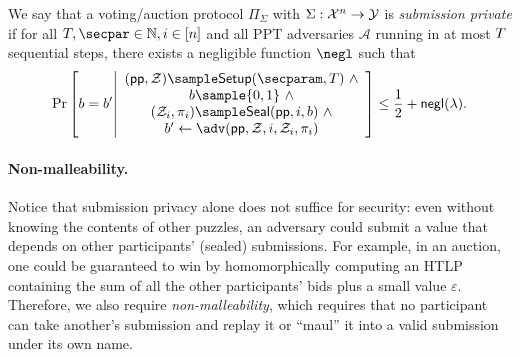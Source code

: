 \begin{definition}\label{def:submission_privacy}
We say that a voting/auction protocol $\Pi_\Sigma$ with $\Sigma: \mathcal{X}^n \to \mathcal{Y}$ is \emph{submission private} if for all $\Ttime,\secpar \in \mathbb{N}, i \in [n]$ and all PPT adversaries $\mathcal{A}$ running in at most $T$ sequential steps, there exists a negligible function $\negl$ such that 
\begin{equation*}
    \Pr\left[
        b=b'
        \middle|
        \begin{array}{c}
            (\pparam, \Z) \sample \Setup(\secparam, \Ttime)~\land\\       
            b\sample\{0,1\}~\land\\
            (\Z_i, \pi_i) \sample \Seal(\pparam, i, b)~\land\\
            b'\gets\adv(\pparam,\Z,i, \Z_i, \pi_i)\\
        \end{array}
    \right]
    \leq \frac{1}{2} + \mathsf{negl}(\lambda).
\end{equation*}
\end{definition}

\paragraph{Non-malleability.} 
Notice that submission privacy alone does not suffice for security: even without knowing the contents of other puzzles, an adversary could submit a value that depends on other participants' (sealed) submissions. For example, in an auction, one could be guaranteed to win by homomorphically computing an HTLP containing the sum of all the other participants' bids plus a small value $\varepsilon$. Therefore, we also require \emph{non-malleability}, which requires that no participant can take another's submission and replay it or ``maul'' it into a valid submission under its own name.

